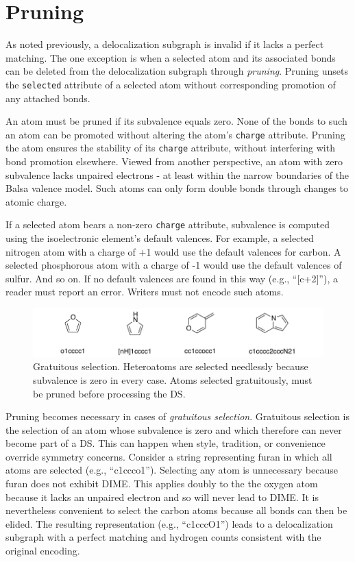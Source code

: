 \documentclass{article}
\def\ttt{\texttt}
\begin{document}
\section*{Pruning}

As noted previously, a delocalization subgraph is invalid if it lacks a perfect matching. The one exception is when a selected atom and its associated bonds can be deleted from the delocalization subgraph through \textit{pruning}. Pruning unsets the \ttt{selected} attribute of a selected atom without corresponding promotion of any attached bonds.

An atom must be pruned if its subvalence equals zero. None of the bonds to such an atom can be promoted without altering the atom's \ttt{charge} attribute. Pruning the atom ensures the stability of its \ttt{charge} attribute, without interfering with bond promotion elsewhere. Viewed from another perspective, an atom with zero subvalence lacks unpaired electrons - at least within the narrow boundaries of the Balsa valence model. Such atoms can only form double bonds through changes to atomic charge. 

If a selected atom bears a non-zero \ttt{charge} attribute, subvalence is computed using the isoelectronic element's default valences. For example, a selected nitrogen atom with a charge of +1 would use the default valences for carbon. A selected phosphorous atom with a charge of -1 would use the default valences of sulfur. And so on. If no default valences are found in this way (e.g., \enquote{[c+2]}), a reader must report an error. Writers must not encode such atoms.

\begin{figure}
    \centering
    \includegraphics[width=\columnwidth]{gratuitous-selection.pdf}
    \caption{Gratuitous selection. Heteroatoms are selected needlessly because subvalence is zero in every case. Atoms selected gratuitously, must be pruned before processing the DS.}
    \label{fig:gratuitous-selection}
\end{figure}

Pruning becomes necessary in cases of \textit{gratuitous selection}. Gratuitous selection is the selection of an atom whose subvalence is zero and which therefore can never become part of a DS. This can happen when style, tradition, or convenience override symmetry concerns. Consider a string representing furan in which all atoms are selected (e.g., \enquote{c1ccco1}). Selecting any atom is unnecessary because furan does not exhibit DIME. This applies doubly to the the oxygen atom because it lacks an unpaired electron and so will never lead to DIME. It is nevertheless convenient to select the carbon atoms because all bonds can then be elided. The resulting representation (e.g., \enquote{c1cccO1}) leads to a delocalization subgraph with a perfect matching and hydrogen counts consistent with the original encoding.
\end{document}
